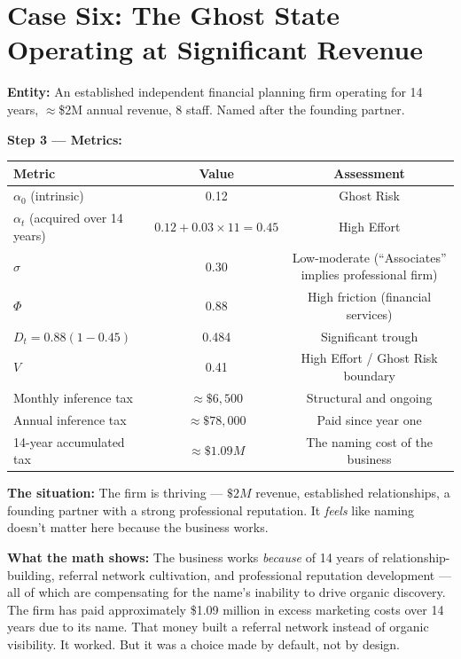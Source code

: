 \documentclass[12pt, openany]{book}
\theoremstyle{thmstyle}
\theoremstyle{defstyle}
\begin{document}
\section{Case Six: The Ghost State Operating at Significant Revenue}

\begin{casebox}
\textbf{Entity:} An established independent financial planning firm operating for 14 years, $\approx$\$2M annual revenue, 8 staff. Named after the founding partner.

\textbf{Step 3 --- Metrics:}
\begin{center}
\begin{tabular}{lcc}
\toprule
Metric & Value & Assessment \\
\midrule
$\alpha_0$ (intrinsic) & 0.12 & Ghost Risk \\
$\alpha_t$ (acquired over 14 years) & $0.12 + 0.03 \times 11 = 0.45$ & High Effort \\
$\sigma$ & 0.30 & Low-moderate (``Associates'' implies professional firm) \\
$\Phi$ & 0.88 & High friction (financial services) \\
$D_t = 0.88(1-0.45)$ & 0.484 & Significant trough \\
$V$ & 0.41 & High Effort / Ghost Risk boundary \\
Monthly inference tax & $\approx \$6{,}500$ & Structural and ongoing \\
Annual inference tax & $\approx \$78{,}000$ & Paid since year one \\
14-year accumulated tax & $\approx \$1.09M$ & The naming cost of the business \\
\bottomrule
\end{tabular}
\end{center}

\textbf{The situation:} The firm is thriving --- $\$2M$ revenue, established relationships, a founding partner with a strong professional reputation. It \textit{feels} like naming doesn't matter here because the business works.

\textbf{What the math shows:} The business works \textit{because} of 14 years of relationship-building, referral network cultivation, and professional reputation development --- all of which are compensating for the name's inability to drive organic discovery. The firm has paid approximately \$1.09 million in excess marketing costs over 14 years due to its name. That money built a referral network instead of organic visibility. It worked. But it was a choice made by default, not by design.


\end{casebox}
\end{document}
